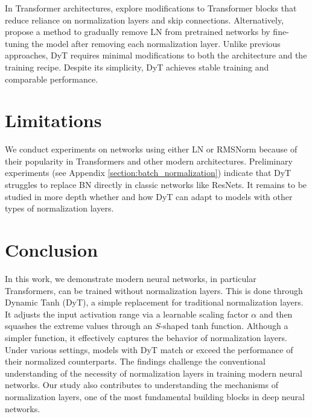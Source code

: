 In Transformer architectures, \citet{he2023simplifying} explore modifications to Transformer blocks that reduce reliance on normalization layers and skip connections. Alternatively, \citet{heimersheim2024you} propose a method to gradually remove LN from pretrained networks by fine-tuning the model after removing each normalization layer.
Unlike previous approaches, DyT requires minimal modifications to both the architecture and the training recipe. Despite its simplicity, DyT achieves stable training and comparable performance.







\section{Limitations}

We conduct experiments on networks using either LN or RMSNorm because of their popularity in Transformers and other modern architectures. Preliminary experiments (see Appendix \ref{section:batch_normalization}) indicate that DyT struggles to replace BN directly in classic networks like ResNets. It remains to be studied in more depth whether and how DyT can adapt to models with other types of normalization layers.




\section{Conclusion}

In this work, we demonstrate modern neural networks, in particular Transformers, can be trained without normalization layers. This is done through Dynamic Tanh (DyT), a simple replacement for traditional normalization layers. It adjusts the input activation range via a learnable scaling factor $\alpha$ and then squashes the extreme values through an $S$-shaped tanh function. Although a simpler function, it effectively captures the behavior of normalization layers. Under various settings, models with DyT match or exceed the performance of their normalized counterparts. The findings challenge the conventional understanding of the necessity of normalization layers in training modern neural networks. Our study also contributes to understanding the mechanisms of normalization layers, one of the most fundamental building blocks in deep neural networks.

